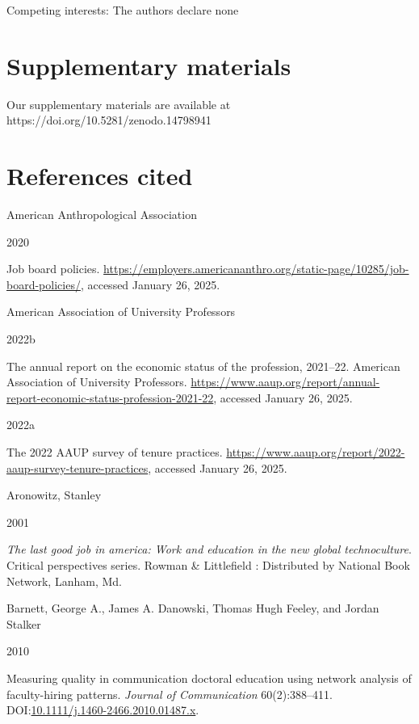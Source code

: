 \documentclass[
  12pt,
]{article}
\newlength{\cslhangindent}
\newlength{\csllabelwidth}
\newenvironment{CSLReferences}[2] %
 {\begin{list}{}{%
  \setlength{\itemindent}{0pt}
  \setlength{\leftmargin}{0pt}
  \setlength{\parsep}{0pt}
  \ifodd #1
   \setlength{\leftmargin}{\cslhangindent}
   \setlength{\itemindent}{-1\cslhangindent}
  \fi
  \setlength{\itemsep}{#2\baselineskip}}}
 {\end{list}}
\newcommand{\CSLBlock}[1]{\hfill\break\parbox[t]{\linewidth}{\strut\ignorespaces#1\strut}}
\newcommand{\CSLLeftMargin}[1]{\parbox[t]{\csllabelwidth}{\strut#1\strut}}
\newcommand{\CSLRightInline}[1]{\parbox[t]{\linewidth - \csllabelwidth}{\strut#1\strut}}
\begin{document}
Competing interests: The authors declare none

\section{Supplementary materials}\label{supplementary-materials}

Our supplementary materials are available at
https://doi.org/10.5281/zenodo.14798941

\newpage

\section{References cited}\label{references-cited}

\label{refs}
\begin{CSLReferences}{0}{1}
\CSLBlock{American Anthropological Association}
\CSLLeftMargin{ 2020}%
\CSLRightInline{Job board policies.
\url{https://employers.americananthro.org/static-page/10285/job-board-policies/},
accessed January 26, 2025.}

\CSLBlock{American Association of University Professors}
\CSLLeftMargin{ 2022b}%
\CSLRightInline{The annual report on the economic status of the
profession, 2021--22. American Association of University Professors.
\url{https://www.aaup.org/report/annual-report-economic-status-profession-2021-22},
accessed January 26, 2025.}

\CSLLeftMargin{ 2022a }%
\CSLRightInline{The 2022 AAUP survey of tenure practices.
\url{https://www.aaup.org/report/2022-aaup-survey-tenure-practices},
accessed January 26, 2025.}

\CSLBlock{Aronowitz, Stanley}
\CSLLeftMargin{ 2001}%
\CSLRightInline{\emph{The last good job in america: Work and education
in the new global technoculture}. Critical perspectives series. Rowman
\& Littlefield : Distributed by National Book Network, Lanham, Md.}

\CSLBlock{Barnett, George A., James A. Danowski, Thomas Hugh Feeley, and
Jordan Stalker}
\CSLLeftMargin{ 2010}%
\CSLRightInline{Measuring quality in communication doctoral education
using network analysis of faculty-hiring patterns. \emph{Journal of
Communication} 60(2):388--411.
DOI:\href{https://doi.org/10.1111/j.1460-2466.2010.01487.x}{10.1111/j.1460-2466.2010.01487.x}.}


\end{CSLReferences}
\end{document}
